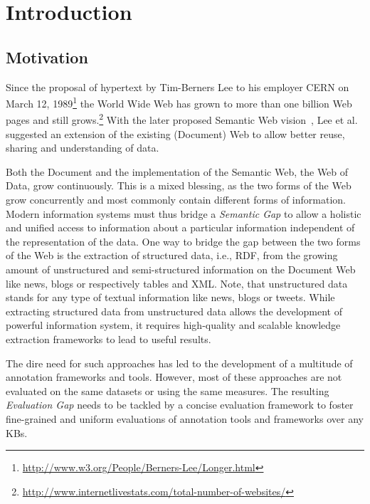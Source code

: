 \chapter{Introduction}

\section*{Motivation}

Since the proposal of hypertext by Tim-Berners Lee to his employer CERN on March 12, 1989\footnote{\url{http://www.w3.org/People/Berners-Lee/Longer.html}} the World Wide Web has grown to more than one billion Web pages and still grows.\footnote{\url{http://www.internetlivestats.com/total-number-of-websites/}}
With the later proposed Semantic Web vision~\cite{bernerslee2001semantic}, Lee et al. suggested an extension of the existing (Document) Web to allow better reuse, sharing and understanding of data.

Both the Document and the implementation of the Semantic Web, the Web of Data, grow continuously. 
This is a mixed blessing, as the two forms of the Web grow concurrently and most commonly contain different forms of information. 
Modern information systems must thus bridge a \emph{Semantic Gap} to allow a holistic and unified access to information about a particular information independent of the representation of the data.
One way to bridge the gap between the two forms of the Web is the extraction of structured data, i.e., \ac{RDF}, from the growing amount of unstructured and semi-structured information on the Document Web like news, blogs or respectively tables and XML.
Note, that unstructured data stands for any type of textual information like news, blogs or tweets. 
While extracting structured data from unstructured data allows the development of powerful information system, it requires high-quality and scalable knowledge extraction frameworks to lead to useful results. 

The dire need for such approaches has led to the development of a multitude of annotation frameworks and tools. 
However, most of these approaches are not evaluated on the same datasets or using the same measures.
The resulting \emph{Evaluation Gap} needs to be tackled by a concise evaluation framework to foster fine-grained and uniform evaluations of annotation tools and frameworks over any \ac{KB}s.

